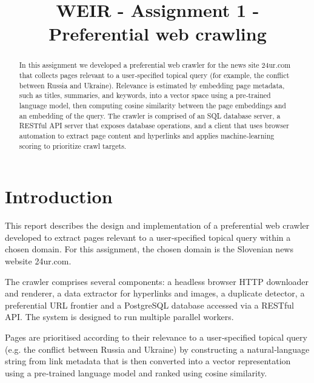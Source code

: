 \documentclass[conference]{IEEEtran}
\begin{document}
\title{WEIR - Assignment 1 - Preferential web crawling}



\author{

}

\maketitle


\begin{abstract}
In this assignment we developed a preferential web crawler for the news site 24ur.com that collects pages relevant to a user‑specified topical query (for example, the conflict between Russia and Ukraine). Relevance is estimated by embedding page metadata, such as titles, summaries, and keywords, into a vector space using a pre‑trained language model, then computing cosine similarity between the page embeddings and an embedding of the query. The crawler is comprised of an SQL database server, a RESTful API server that exposes database operations, and a client that uses browser automation to extract page content and hyperlinks and applies machine‑learning scoring to prioritize crawl targets.
\end{abstract}

\IEEEpeerreviewmaketitle

\section{Introduction}
This report describes the design and implementation of a preferential web crawler developed to extract pages 
relevant to a user‑specified topical query within a chosen domain. For this assignment, the chosen domain 
is the Slovenian news website 24ur.com.

The crawler comprises several components: a headless browser HTTP downloader and renderer, 
a data extractor for hyperlinks and images, a duplicate detector, a preferential URL frontier 
and a PostgreSQL database accessed via a RESTful API. The system is designed to run multiple parallel workers.

Pages are prioritised according to their relevance to a user‑specified topical query (e.g. 
the conflict between Russia and Ukraine) by constructing a natural‑language string from link metadata that is then converted into a vector representation using a pre‑trained language model and ranked 
using cosine similarity. 
\end{document}
